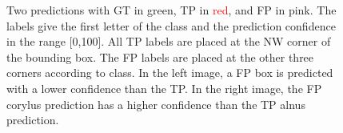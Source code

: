 \begin{figure}[htb]
\begin{subfigure}[t]{0.4\textwidth}
  \end{subfigure}
  \caption[Predictions showing TP overlapped by FP from different class]{Two predictions with GT in \textcolor{nicegreen}{green}, TP in \textcolor{red}{red}, and FP in \textcolor{nicepink}{pink}.
The labels give the first letter of the class and the prediction confidence in the range [0,100].
All TP labels are placed at the NW corner of the bounding box.
The FP labels are placed at the other three corners according to class.
In the left image, a FP box is predicted with a lower confidence than the TP\@.
In the right image, the FP corylus prediction has a higher confidence than the TP alnus prediction.}\label{fig:method-overlapping-predictions}
\end{figure}



